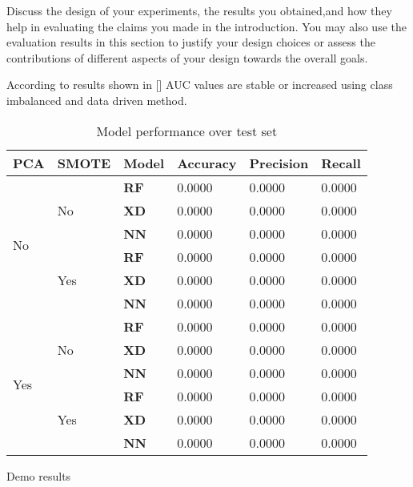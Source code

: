 Discuss the design of your experiments, the results you obtained,and how they help in evaluating the claims you made in the introduction. You may also use the evaluation results in this section to justify your design choices or assess the contributions of different aspects of your design towards the overall goals.



According to results shown in [] AUC values are stable or increased using class imbalanced and data driven method. 



\begin{table}[h]
\begin{tabular}{@{}|l|l|l|l|l|l|@{}}
\toprule
\textbf{PCA} & \textbf{SMOTE} & \textbf{Model} & \textbf{Accuracy} & \textbf{Precision} & \textbf{Recall} \\ \midrule
\multirow{6}{*}{No}  & \multirow{3}{*}{No}  & \textbf{RF} & 0.0000 & 0.0000 & 0.0000 \\ \cmidrule(l){3-6} 
                     &                      & \textbf{XD} & 0.0000 & 0.0000 & 0.0000 \\ \cmidrule(l){3-6} 
                     &                      & \textbf{NN} & 0.0000 & 0.0000 & 0.0000 \\ \cmidrule(l){2-6} 
                     & \multirow{3}{*}{Yes} & \textbf{RF} & 0.0000 & 0.0000 & 0.0000 \\ \cmidrule(l){3-6} 
                     &                      & \textbf{XD} & 0.0000 & 0.0000 & 0.0000 \\ \cmidrule(l){3-6} 
                     &                      & \textbf{NN} & 0.0000 & 0.0000 & 0.0000 \\ \midrule
\multirow{6}{*}{Yes} & \multirow{3}{*}{No}  & \textbf{RF} & 0.0000 & 0.0000 & 0.0000 \\ \cmidrule(l){3-6} 
                     &                      & \textbf{XD} & 0.0000 & 0.0000 & 0.0000 \\ \cmidrule(l){3-6} 
                     &                      & \textbf{NN} & 0.0000 & 0.0000 & 0.0000 \\ \cmidrule(l){2-6} 
                     & \multirow{3}{*}{Yes} & \textbf{RF} & 0.0000 & 0.0000 & 0.0000 \\ \cmidrule(l){3-6} 
                     &                      & \textbf{XD} & 0.0000 & 0.0000 & 0.0000 \\ \cmidrule(l){3-6} 
                     &                      & \textbf{NN} & 0.0000 & 0.0000 & 0.0000 \\ \bottomrule
\end{tabular}
\caption{Model performance over test set}
\label{tab:model performance}
\end{table}

\begin{table}
    
    \caption{Demo results}
    \label{tab:results}
\end{table}